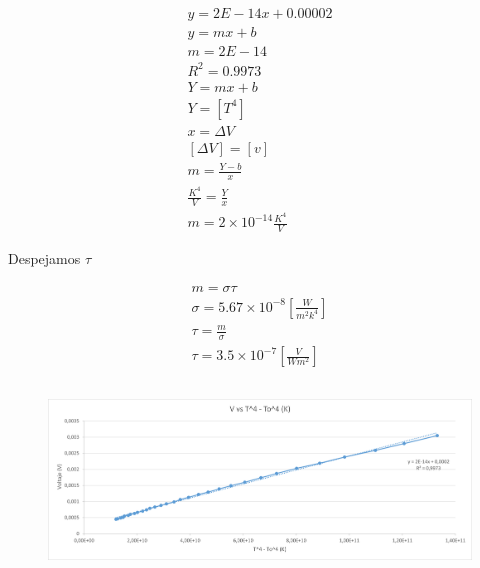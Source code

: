\documentclass[letterpaper, 12pt]{article}
\begin{document}
\begin{equation*}
      \begin{gathered}
            y = 2E - 14x + 0.00002 \\
            y = mx + b \\
            m = 2E - 14 \\
            R^{2} = 0.9973 \\
            Y = mx + b \\
            Y = [T^4] \\
            x = \Delta V \\
            [\Delta V] = [v] \\
            m = \frac{Y - b}{x} \\
            \frac{K^4}{V} = \frac{Y}{x} \\
            m = 2 \times 10^{-14} \frac{K^{4}}{V}
      \end{gathered}
\end{equation*}

Despejamos $\tau$

\begin{equation*}
      \begin{gathered}
            m = \sigma \tau \\
            \sigma = 5.67 \times 10^{-8} [\frac{W}{m^{2} k^{4}}] \\
            \tau = \frac{m}{\sigma} \\
            \tau = 3.5 \times 10^{-7} [\frac{V}{W m^{2}}]
      \end{gathered}
\end{equation*}

\subsection{}

\begin{figure}[H]
      \begin{center}
            \includegraphics[width=\linewidth]{./Images/grafico2.png}
            \caption{}
      \end{center}
\end{figure}
\end{document}
